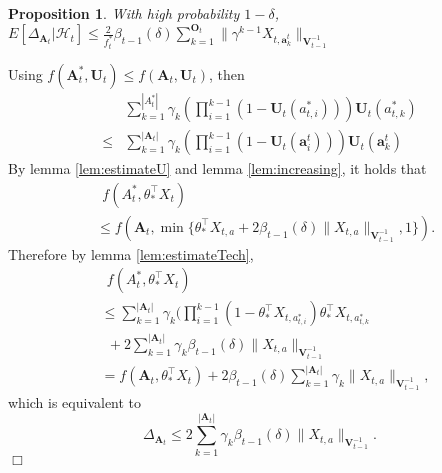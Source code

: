 \documentclass{article}
\newcommand{\bA}{\mathbf{A}}
\newcommand{\ba}{\mathbf{a}}
\newcommand{\bO}{\mathbf{O}}
\newcommand{\bU}{\mathbf{U}}
\newcommand{\bV}{\mathbf{V}}
\newcommand{\cH}{\mathcal{H}}
\newcommand{\abs}[1]{\left| #1 \right|}
\newcommand{\norm}[1]{\| #1 \|}
\newtheorem{proposition}[theorem]{Proposition}%
\newenvironment{proof}{\noindent {\textbf{Proof. }}}{$\Box$ \medskip}
\begin{document}
\begin{proposition}
	With high probability $1-\delta$, $E[\Delta_{\bA_t}|\cH_t] \leq \frac{2}{f_t^*} \beta_{t-1}(\delta)\sum_{k=1}^{\bO_t}\norm{\gamma^{k-1}X_{t,\ba_k^t}}_{\bV_{t-1}^{-1}}$
\end{proposition}
\begin{proof}
	Using $f(\bA_t^*,\bU_t) \leq f(\bA_t,\bU_t)$, then
	\begin{align*}
		&\sum_{k=1}^{\abs{A_t^*}}\gamma_k (\prod_{i=1}^{k-1}(1 -\bU_t(a_{t,i}^*)))\bU_t(a_{t,k}^*) \\
		\leq &\sum_{k=1}^{\abs{\bA_t}}\gamma_k (\prod_{i=1}^{k-1}(1 -\bU_t(\ba_i^t)))\bU_t(\ba_k^t) 
	\end{align*}
		By lemma \ref{lem:estimateU} and lemma \ref{lem:increasing}, it holds that
		\begin{align*}
		&~~f(A_t^*, \theta_*^{\top}X_t) \\
		&\leq f(\bA_t, \min\{\theta_*^{\top}X_{t,a}+2\beta_{t-1}(\delta)\norm{X_{t,a}}_{\bV_{t-1}^{-1}},1\}).
		\end{align*}
		Therefore by lemma \ref{lem:estimateTech},
		\begin{align*}
		&~~f(A_t^*, \theta_*^{\top}X_t) \\
		&\leq  \sum_{k=1}^{\abs{\bA_t}}\gamma_k (\prod_{i=1}^{k-1}(1 -\theta_*^{\top}X_{t,a_{t,i}^*})\theta_*^{\top}X_{t,a_{t,k}^*} \\
		&~~ + 2\sum_{k=1}^{\abs{\bA_t}}\gamma_k\beta_{t-1}(\delta)\norm{X_{t,a}}_{\bV_{t-1}^{-1}}\\
		&=f(\bA_t, \theta_*^{\top}X_t) + 2\beta_{t-1}(\delta)\sum_{k=1}^{\abs{\bA_t}}\gamma_k\norm{X_{t,a}}_{\bV_{t-1}^{-1}},
		\end{align*}
		which is equivalent to 
		$$
		\Delta_{\bA_t} \leq 2\sum_{k=1}^{\abs{\bA_t}}\gamma_k\beta_{t-1}(\delta)\norm{X_{t,a}}_{\bV_{t-1}^{-1}}.
		$$
	\end{proof}
	
\end{document}
